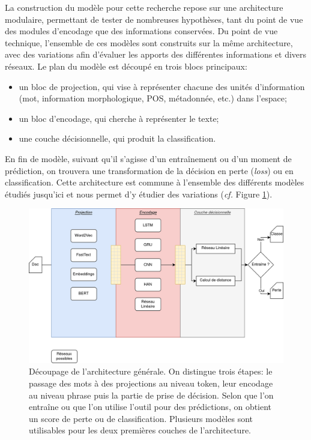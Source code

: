 La construction du modèle pour cette recherche repose sur une architecture modulaire, permettant de tester de nombreuses hypothèses, tant du point de vue des modules d'encodage que des informations conservées. Du point de vue technique, l'ensemble de ces modèles sont construits sur la même architecture, avec des variations afin d'évaluer les apports des différentes informations et divers réseaux. Le plan du modèle est découpé en trois blocs principaux: 
\begin{itemize}
    \item un bloc de projection, qui vise à représenter chacune des unités d'information (mot, information morphologique, POS, métadonnée, etc.) dans l'espace;
    \item un bloc d'encodage, qui cherche à représenter le texte;
    \item une couche décisionnelle, qui produit la classification.
\end{itemize}
En fin de modèle, suivant qu'il s'agisse d'un entraînement ou d'un moment de prédiction, on trouvera une transformation de la décision en perte (\textit{loss}) ou en classification. Cette architecture est commune à l'ensemble des différents modèles étudiés jusqu'ici et nous permet d'y étudier des variations (\textit{cf.} Figure \ref{fig:chap4:Architecture}).

\begin{figure}
    \centering
    \includegraphics[width=\linewidth]{figures/chap4/architecture.png}
    \caption{Découpage de l'architecture générale. On distingue trois étapes: le passage des mots à des projections au niveau token, leur encodage au niveau phrase puis la partie de prise de décision. Selon que l'on entraîne ou que l'on utilise l'outil pour des prédictions, on obtient un score de perte ou de classification. Plusieurs modèles sont utilisables pour les deux premières couches de l'architecture.}
    \label{fig:chap4:Architecture}
\end{figure}

